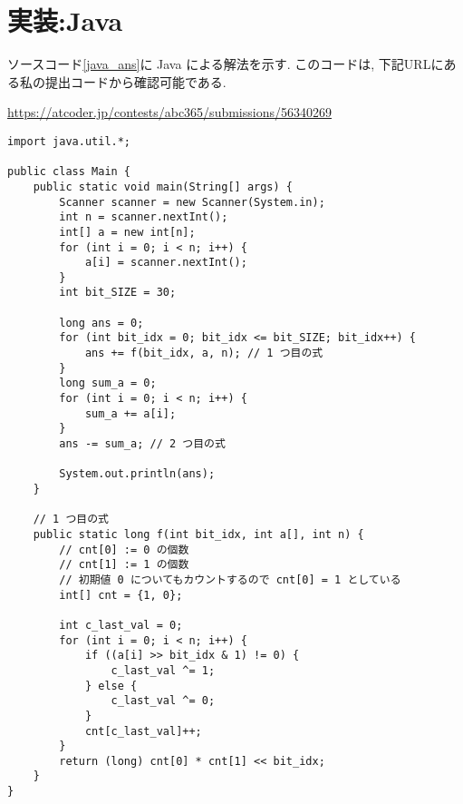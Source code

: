     \section*{実装:Java}
    ソースコード\ref{java_ans}に Java による解法を示す.
    このコードは, 下記URLにある私の提出コードから確認可能である.

    \url{https://atcoder.jp/contests/abc365/submissions/56340269}
\begin{lstlisting}[caption=Javaのコード, label=java_ans]
import java.util.*;

public class Main {
    public static void main(String[] args) {
        Scanner scanner = new Scanner(System.in);
        int n = scanner.nextInt();
        int[] a = new int[n];
        for (int i = 0; i < n; i++) {
            a[i] = scanner.nextInt();
        }
        int bit_SIZE = 30;

        long ans = 0;
        for (int bit_idx = 0; bit_idx <= bit_SIZE; bit_idx++) {
            ans += f(bit_idx, a, n); // 1 つ目の式
        }
        long sum_a = 0;
        for (int i = 0; i < n; i++) {
            sum_a += a[i];
        }
        ans -= sum_a; // 2 つ目の式

        System.out.println(ans);
    }

    // 1 つ目の式
    public static long f(int bit_idx, int a[], int n) {
        // cnt[0] := 0 の個数
        // cnt[1] := 1 の個数
        // 初期値 0 についてもカウントするので cnt[0] = 1 としている
        int[] cnt = {1, 0};

        int c_last_val = 0;
        for (int i = 0; i < n; i++) {
            if ((a[i] >> bit_idx & 1) != 0) {
                c_last_val ^= 1;
            } else {
                c_last_val ^= 0;
            }
            cnt[c_last_val]++;
        }
        return (long) cnt[0] * cnt[1] << bit_idx;
    }
}
\end{lstlisting}
